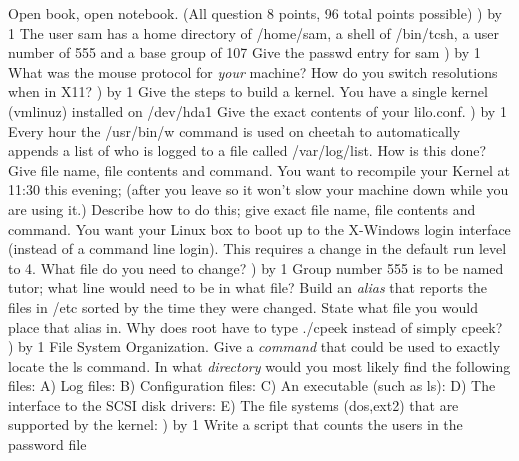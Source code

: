 
\parindent=0in
\nopagenumbers
\newcount\quesno
{}
\def\ques{\number\quesno) \advance\quesno by 1}
\def\aspace{\vskip 1.5in}

Open book, open notebook. (All question 8 points, 96 total points possible)
\hfill\break
\ques
The user {\ltt{}sam} has  a home directory of {\ltt{}/home/sam},
a shell of {\ltt{}/bin/tcsh}, a user number of {\ltt{}555}
and a base group of {\ltt{}107}
Give the {\ltt{}passwd} entry for {\ltt{}sam}
\vskip 1.0in
\ques
What was the mouse protocol for {\it your} machine?
\vskip 0.4in
How do you switch resolutions when in X11?
\vskip 0.5in
\ques
Give the steps to build a kernel.
\vskip 2.0in
You have a single kernel ({\ltt{}vmlinuz}) installed on {\ltt{}/dev/hda1}
Give the exact contents of your {\ltt{}lilo.conf}.
\vskip 1.8in
\vfill\eject
\ques
Every hour the {\ltt{}/usr/bin/w} command is used on cheetah to automatically
appends a list of who is logged 
to a file called {\ltt{}/var/log/list}.
How is this done? Give file name, file contents and command.
\vskip 1.0in
You want to recompile your Kernel at 11:30 this evening;
(after you leave so it won't slow your machine down while
you are using it.)
Describe how to do this; give exact file name, file contents and command.
\vskip 1.2in
You want your Linux box to boot up to the X-Windows login interface
(instead of a command line login).
This requires a change in the default run level to 4.
What file do you need to change?
\vskip 0.5in
\ques
Group number {\ltt{}555} is to be named {\ltt{}tutor}; what
line would need to be in what file?
\vskip 1.0in
Build an {\it alias} that reports the files in {\ltt{}/etc} sorted by the
time they were changed. State what file you would place that alias
in.
\vskip 0.5in
Why does {\ltt{}root} have to type {\ltt{}./cpeek} instead
of simply {\ltt{}cpeek}?
\vskip 0.5in
\ques
File System Organization.
\hfill\break
Give a {\it command} that could be used to exactly locate the
{\ltt{}ls} command.
\vskip 0.4in
In what {\it directory} would you most likely find
the following files:
\hfill\break
A) Log files:
\vskip 0.2in
B) Configuration files:
\vskip 0.2in
C) An executable (such as {\ltt{}ls}):
\vskip 0.2in
D) The interface to the SCSI disk drivers:
\vskip 0.2in
E) The file systems (dos,ext2) that are supported by the kernel:
\vskip 0.2in
\vfill\eject
\ques
Write a script that counts the users in the password file

